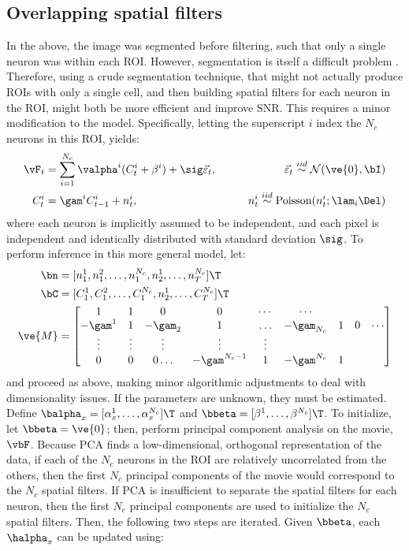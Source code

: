 \subsection{Overlapping spatial filters} \label{sec:methods:overlapping}

In the above, the image was segmented before filtering, such that only a single neuron was within each ROI.  However, segmentation is itself a difficult problem \cite{ShiMalik97}.  Therefore, using a crude segmentation technique, that might not actually produce ROIs with only a single cell, and then building spatial filters for each neuron in the ROI, might both be more efficient and improve SNR.  This requires a minor modification to the model.  Specifically, letting the superscript $i$ index the $N_c$ neurons in this ROI, yields:  
\begin{align}
\vF_t &= \sum_{i=1}^{N_c}\valpha^i (C^i_t + \beta^i) +  \sig\vec{\varepsilon}_t, \qquad &\vec{\varepsilon}_t \overset{iid}{\sim} \mathcal{N}(\ve{0},\bI)   \\
C^i_t &= \gam^i C^i_{t-1} + n^i_t, & n^i_t \overset{iid}{\sim} \text{Poisson}(n^i_t; \lam_i \Del)
\end{align}
\noindent where each neuron is implicitly assumed to be independent, and each pixel is independent and identically distributed with standard deviation $\sig$.  To perform inference in this more general model, let:
\begin{align} \label{eq:M2}
\bn &=  [n^1_1, n^2_1, \ldots, n^{N_c}_1, n^1_2, \ldots, n^{N_c}_T]\T \\
\bC &=  [C^1_1, C^2_1, \ldots, C^{N_c}_1, n^1_2, \ldots, C^{N_c}_T]\T \\
\ve{M} &= %
\begin{bmatrix}
1 & 1 & 0 & 0 & \cdots & \cdots \\
-\gam^1 &  1 & -\gam_2 & 1 & \ldots &  -\gam_{N_c} & 1 & 0 & \cdots \\
\vdots & \vdots & \vdots & \vdots & \vdots  \\
0 & 0 & 0 \ldots &  -\gam^{N_c-1} & 1 & -\gam^{N_c} & 1 
\end{bmatrix}
\end{align} 
\noindent and proceed as above, making minor algorithmic adjustments to deal with dimensionality issues.  If the parameters are unknown, they must be estimated. Define $\balpha_x=[\alpha_x^1, \ldots, \alpha_x^{N_c}]\T$ and $\bbeta=[\beta^1, \ldots, \beta^{N_c}]\T$.  To initialize, let $\bbeta=\ve{0}$; then, perform principal component analysis on the movie, $\vbF$.  Because PCA finds a low-dimensional, orthogonal representation of the data, if each of the $N_c$ neurons in the ROI are relatively uncorrelated from the others, then the first $N_c$ principal components of the movie would correspond to the $N_c$ spatial filters.  If PCA is insufficient to separate the spatial filters for each neuron, then the first $N_c$ principal components are used to initialize the $N_c$ spatial filters.  Then, the following two steps are iterated.  Given $\bbeta$, each $\halpha_x$ can be updated using:
